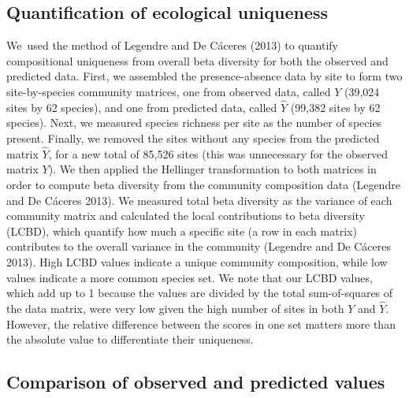 \documentclass[11pt]{article}
\begin{document}
\hypertarget{quantification-of-ecological-uniqueness}{%
\subsection{Quantification of ecological
uniqueness}\label{quantification-of-ecological-uniqueness}}

We~used the method of Legendre and De Cáceres (2013) to quantify
compositional uniqueness from overall beta diversity for both the
observed and predicted data. First, we assembled the presence-absence
data by site to form two site-by-species community matrices, one from
observed data, called \(Y\) (39,024 sites by 62 species), and one from
predicted data, called \(\hat Y\) (99,382 sites by 62 species). Next, we
measured species richness per site as the number of species present.
Finally, we removed the sites without any species from the predicted
matrix \(\hat Y\), for a new total of 85,526 sites (this was unnecessary
for the observed matrix \(Y\)). We then applied the Hellinger
transformation to both matrices in order to compute beta diversity from
the community composition data (Legendre and De Cáceres 2013). We
measured total beta diversity as the variance of each community matrix
and calculated the local contributions to beta diversity (LCBD), which
quantify how much a specific site (a row in each matrix) contributes to
the overall variance in the community (Legendre and De Cáceres 2013).
High LCBD values indicate a unique community composition, while low
values indicate a more common species set. We note that our LCBD values,
which add up to 1 because the values are divided by the total
sum-of-squares of the data matrix, were very low given the high number
of sites in both \(Y\) and \(\hat Y\). However, the relative difference
between the scores in one set matters more than the absolute value to
differentiate their uniqueness.

\hypertarget{comparison-of-observed-and-predicted-values}{%
\subsection{Comparison of observed and predicted
values}\label{comparison-of-observed-and-predicted-values}}
\end{document}
